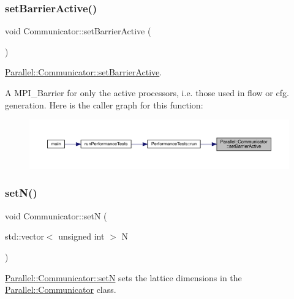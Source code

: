 \subsubsection{\texorpdfstring{setBarrierActive()}{setBarrierActive()}}
{\footnotesize\ttfamily void Communicator\+::set\+Barrier\+Active (\begin{DoxyParamCaption}{ }\end{DoxyParamCaption})\hspace{0.3cm}{\ttfamily [static]}}



\mbox{\hyperlink{class_parallel_1_1_communicator_af61a4b8a49509982ae96d2a99dfb9f49}{Parallel\+::\+Communicator\+::set\+Barrier\+Active}}. 

A M\+P\+I\+\_\+\+Barrier for only the active processors, i.\+e. those used in flow or cfg. generation. Here is the caller graph for this function\+:
\nopagebreak
\begin{figure}[H]
\begin{center}
\leavevmode
\includegraphics[width=350pt]{class_parallel_1_1_communicator_af61a4b8a49509982ae96d2a99dfb9f49_icgraph}
\end{center}
\end{figure}
\mbox{\label{class_parallel_1_1_communicator_a1db417babab93c8d8bf6339ff2bab540}} 
\subsubsection{\texorpdfstring{setN()}{setN()}}
{\footnotesize\ttfamily void Communicator\+::setN (\begin{DoxyParamCaption}\item[{std\+::vector$<$ unsigned int $>$}]{N }\end{DoxyParamCaption})\hspace{0.3cm}{\ttfamily [static]}}



\mbox{\hyperlink{class_parallel_1_1_communicator_a1db417babab93c8d8bf6339ff2bab540}{Parallel\+::\+Communicator\+::setN}} sets the lattice dimensions in the \mbox{\hyperlink{class_parallel_1_1_communicator}{Parallel\+::\+Communicator}} class. 


